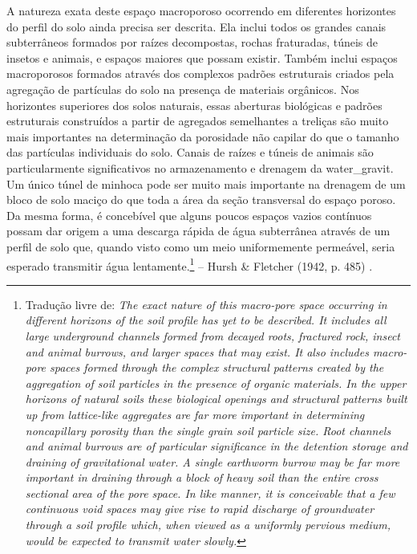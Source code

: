\documentclass[./main.tex]{subfiles}
\begin{document}
\begin{adjustwidth}{100pt}{0pt}
\medskip
\small A natureza exata deste espaço macroporoso ocorrendo em diferentes horizontes do perfil do solo ainda precisa ser descrita. Ela inclui todos os grandes canais subterrâneos formados por raízes decompostas, rochas fraturadas, túneis de insetos e animais, e espaços maiores que possam existir. Também inclui espaços macroporosos formados através dos complexos padrões estruturais criados pela agregação de partículas do solo na presença de materiais orgânicos. Nos horizontes superiores dos solos naturais, essas aberturas biológicas e padrões estruturais construídos a partir de agregados semelhantes a treliças são muito mais importantes na determinação da porosidade não capilar do que o tamanho das partículas individuais do solo. Canais de raízes e túneis de animais são particularmente significativos no armazenamento e drenagem da \gls{water_gravit}. Um único túnel de minhoca pode ser muito mais importante na drenagem de um bloco de solo maciço do que toda a área da seção transversal do espaço poroso. Da mesma forma, é concebível que alguns poucos espaços vazios contínuos possam dar origem a uma descarga rápida de água subterrânea através de um perfil de solo que, quando visto como um meio uniformemente permeável, seria esperado transmitir água lentamente.\footnote{Tradução livre de: \textit{The exact nature of this macro-pore space occurring in different horizons of the soil profile has yet to be described. It includes all large underground channels formed from decayed roots, fractured rock, insect and animal burrows, and larger spaces that may exist. It also includes macro-pore spaces formed through the complex structural patterns created by the aggregation of soil particles in the presence of organic materials. In the upper horizons of natural soils these biological openings and structural patterns built up from lattice-like aggregates are far more important in determining noncapillary porosity than the single grain soil particle size. Root channels and animal burrows are of particular significance in the detention storage and draining of gravitational water. A single earthworm burrow may be far more important in draining through a block of heavy soil than the entire cross sectional area of the pore space. In like manner, it is conceivable that a few continuous void spaces may give rise to rapid discharge of groundwater through a soil profile which, when viewed as a uniformly pervious medium, would be expected to transmit water slowly.}} -- Hursh \& Fletcher (1942, p. 485) \cite{Hursh1942}.
\medskip
\end{adjustwidth}
\end{document}
